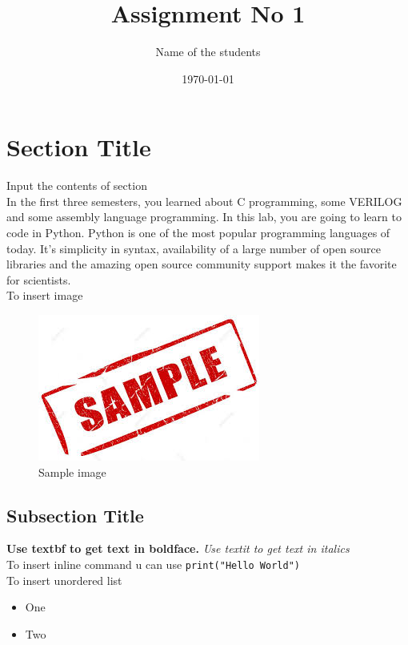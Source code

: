 \documentclass[11pt, a4paper]{article}
\title{Assignment No 1} %
\author{Name of the students} %
\date{\today} %
\begin{document}
		
		
\maketitle %
\section{Section Title}

 Input the contents of section \\
 In the first three semesters, you learned about C programming, some VERILOG and some assembly language programming. In this lab, you are going to learn to code in Python. Python is one of the most popular programming languages of today. It’s simplicity in syntax, availability of a large number of open source libraries and the amazing open source community support makes it the favorite for scientists. \\
To insert image 
   \begin{figure}[!tbh]
   	\centering
   	\includegraphics[scale=0.5]{images.jpeg}  %
   	\caption{Sample image}
   	\label{fig:sample}
   \end{figure} 
\subsection*{Subsection Title}
	
  \textbf{Use textbf to get text in boldface.}
  \textit{Use textit to get text in italics} \\
  To insert inline command u can use \texttt{print("Hello World")} \\
  To insert unordered list
  \begin{itemize}
  	\item One
  	\item Two
  \end{itemize}
 
\end{document}
